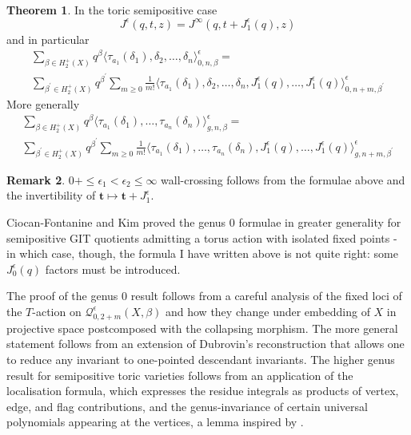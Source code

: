 \documentclass[11pt]{amsart}
\newcommand{\Qe}[4]{\mathcal{Q}^{\epsilon}_{#1,#2}(#3,#4)}
\theoremstyle{definition}
\newtheorem{thm}{Theorem}[section]
\theoremstyle{definition}
\newtheorem{rmk}[thm]{Remark}
\begin{document}
\begin{thm}\label{thm:wcf}
 In the toric semipositive case \cite[Theorem 1.2.2]{CF-K-wallcrossing}
 \[ J^\epsilon(q,t,z)=J^\infty(q,t+J^\epsilon_1(q),z)\]
 and in particular
 \begin{multline*} \sum_{\beta\in H_2^+(X)}q^\beta\langle\tau_{a_1}(\delta_1),\delta_2,\ldots,\delta_n\rangle^\epsilon_{0,n,\beta}= \\ \sum_{\beta^\prime\in H_2^+(X)}q^{\beta^\prime}\sum_{m\geq 0}\frac{1}{m!}\langle\tau_{a_1}(\delta_1),\delta_2,\ldots,\delta_n,J^\epsilon_1(q),\ldots,J^\epsilon_1(q)\rangle^\epsilon_{0,n+m,\beta^\prime}\end{multline*}
 More generally \cite[Theorem 1.3.2]{CF-K-higher-genus}
 \begin{multline*} \sum_{\beta\in H_2^+(X)}q^\beta\langle\tau_{a_1}(\delta_1),\ldots,\tau_{a_n}(\delta_n)\rangle^\epsilon_{g,n,\beta}= \\ \sum_{\beta^\prime\in H_2^+(X)}q^{\beta^\prime}\sum_{m\geq 0}\frac{1}{m!}\langle\tau_{a_1}(\delta_1),\ldots,\tau_{a_n}(\delta_n),J^\epsilon_1(q),\ldots,J^\epsilon_1(q)\rangle^\epsilon_{g,n+m,\beta^\prime}\end{multline*}
\end{thm}
\begin{rmk} $0+\leq \epsilon_1<\epsilon_2\leq\infty$ wall-crossing follows from the formulae above and the invertibility of $\mathbf t\mapsto \mathbf t+J^\epsilon_1$.
\end{rmk}
Ciocan-Fontanine and Kim proved the genus $0$ formulae in greater generality for semipositive GIT quotients admitting a torus action with isolated fixed points - in which case, though, the formula I have written above is not quite right: some $J^\epsilon_0(q)$ factors must be introduced.
            
The proof of the genus $0$ result follows from a careful analysis of the fixed loci of the $T$-action on $\Qe{0}{2+m}{X}{\beta}$ and how they change under embedding of $X$ in projective space postcomposed with the collapsing morphism. The more general statement follows from an extension of Dubrovin's reconstruction that allows one to reduce any invariant to one-pointed descendant invariants. The higher genus result for semipositive toric varieties follows from an application of the localisation formula, which expresses the residue integrals as products of vertex, edge, and flag contributions, and the genus-invariance of certain universal polynomials appearing at the vertices, a lemma inspired by \cite[\S 7.6]{MOP}.
  
\end{document}
